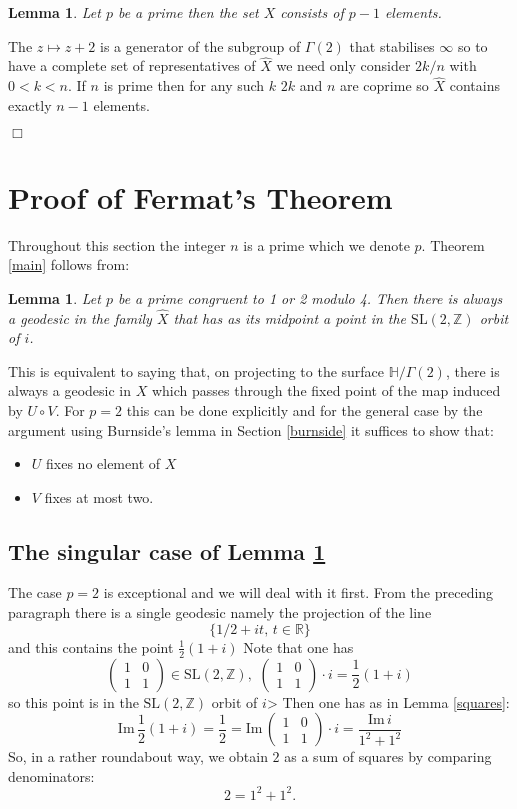 \documentclass[12pt,a4paper]{amsart}
\newtheorem{lem}[thm]{Lemma}
\def\HH{\mathbb{H}}
\def\im{\mathrm{Im}\,}
\def\xx{\HH/g2}
\def\ZZ{\mathbb{Z}}
\def\RR{\mathbb{R}}
\def\sl2{\mathrm{SL}(2, \ZZ)}
\def\g2{\Gamma(2)}
\def\xx{\HH/\g2}
\begin{document}
\begin{lem} \label{action}
Let $p$ be a prime then the set $X$ consists of $p-1$ elements.
\end{lem}
\proof
The $z \mapsto z + 2$ is a generator of the subgroup of $\g2$ that stabilises $\infty$ so to have a complete set of representatives of $\hat{X}$ we need only consider $2k/n$ with $0 < k < n$. If $n$ is prime then for any such $k$ $2k$ and $n$ are coprime so $\hat{X}$ contains exactly $n-1$ elements.

\hfill $\Box$


 
 \section{Proof of Fermat's Theorem}

Throughout this section the integer $n$ is a prime which we denote $p$.
Theorem \ref{main} follows from:

\begin{lem} \label{midpoint}
Let $p$ be a prime congruent to 1 or 2 modulo 4.
Then there is always a geodesic 
in the family $\hat{X}$
that has as its  midpoint a point in the $\sl2$  orbit of $i$.
\end{lem}

This is equivalent to saying that, on projecting to the surface
$\xx$, there  is always a geodesic in $X$ which passes through the
fixed point of the map induced by $U \circ V$. For $p=2$ this can be
done explicitly and for the general case by the argument using 
Burnside's lemma in Section \ref{burnside} it suffices to show that:

\begin{itemize}
	\item $U$ fixes no element of $X$
	\item $V$ fixes at most two.
\end{itemize}

\subsection{The singular case of Lemma \ref{midpoint}}

The case $p=2$ is exceptional and we will deal with it first.
From the preceding paragraph there is a single geodesic namely 
the projection of the line 
$$\{ 1/2 + i t,\, t \in \RR \}$$
and this contains the point  $\frac{1}{2 }(1+ i)$
Note that one has 
$$\begin{pmatrix}
1 & 0 \\
1 & 1
\end{pmatrix} \in \sl2,\,\, \begin{pmatrix}
1 & 0 \\
1 & 1
\end{pmatrix}\cdot  i  = \frac{1}{2 }(1+ i)$$
so this point is in the $\sl2$ orbit of $i$>
Then one has as in Lemma \ref{squares}:
$$\im \frac{1}{2 }(1+ i) = \frac{1}{2}  =  \im \begin{pmatrix}
1 & 0 \\
1 & 1
\end{pmatrix}\cdot i = \frac{\im i}{ 1^2 + 1^2}$$
So, in a rather roundabout way, we obtain $2$ as a sum of squares by comparing denominators:
$$2 = 1^2 + 1^2.$$
\end{document}
